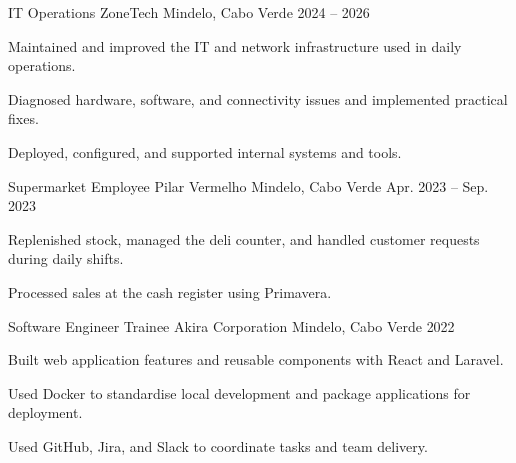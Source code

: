 
\begin{cventries}
  \cventry
    {IT Operations}
    {ZoneTech}
    {Mindelo, Cabo Verde}
    {2024 -- 2026}
    {
      \begin{cvitems}
        \item {Maintained and improved the IT and network infrastructure used in daily operations.}
        \item {Diagnosed hardware, software, and connectivity issues and implemented practical fixes.}
        \item {Deployed, configured, and supported internal systems and tools.}
      \end{cvitems}
    }

  \cventry
    {Supermarket Employee}
    {Pilar Vermelho}
    {Mindelo, Cabo Verde}
    {Apr. 2023 -- Sep. 2023}
    {
      \begin{cvitems}
        \item {Replenished stock, managed the deli counter, and handled customer requests during daily shifts.}
        \item {Processed sales at the cash register using Primavera.}
      \end{cvitems}
    }

  \cventry
    {Software Engineer Trainee}
    {Akira Corporation}
    {Mindelo, Cabo Verde}
    {2022}
    {
      \begin{cvitems}
        \item {Built web application features and reusable components with React and Laravel.}
        \item {Used Docker to standardise local development and package applications for deployment.}
        \item {Used GitHub, Jira, and Slack to coordinate tasks and team delivery.}
      \end{cvitems}
    }
\end{cventries}
